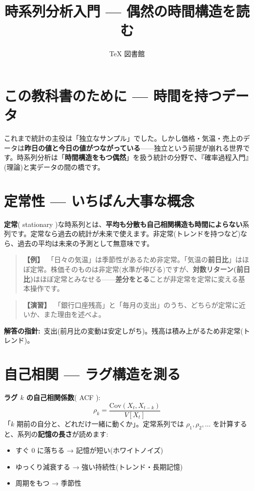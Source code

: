 \documentclass{article}
\title{時系列分析入門 — 偶然の時間構造を読む}
\author{TeX 図書館}
\begin{document}
\section{この教科書のために — 時間を持つデータ}

これまで統計の主役は「独立なサンプル」でした。しかし価格・気温・売上のデータは\textbf{昨日の値と今日の値がつながっている}——独立という前提が崩れる世界です。時系列分析は「\textbf{時間構造をもつ偶然}」を扱う統計の分野で、『確率過程入門』(理論)と実データの間の橋です。

\section{定常性 — いちばん大事な概念}

\textbf{定常}( stationary )な時系列とは、\textbf{平均も分散も自己相関構造も時間によらない}系列です。定常なら過去の統計が未来で使えます。非定常(トレンドを持つなど)なら、過去の平均は未来の予測として無意味です。

\begin{quote}
\textbf{【例】}\ 「日々の気温」は季節性があるため非定常。「気温の\textbf{前日比}」はほぼ定常。株価そのものは非定常(水準が伸びる)ですが、\textbf{対数リターン(前日比)}はほぼ定常とみなせる——\textbf{差分をとる}ことが非定常を定常に変える基本操作です。
\end{quote}

\begin{quote}
\textbf{【演習】}\ 「銀行口座残高」と「毎月の支出」のうち、どちらが定常に近いか、また理由を述べよ。
\end{quote}

\textbf{解答の指針:}\ 支出(前月比の変動は安定しがち)。残高は積み上がるため非定常(トレンド)。

\section{自己相関 — ラグ構造を測る}

\textbf{ラグ \(k\) の自己相関係数}( ACF ):
\[ \rho_k = \frac{\mathrm{Cov}(X_t, X_{t-k})}{V[X_t]} \]
「\(k\) 期前の自分と、どれだけ一緒に動くか」。定常系列では \(\rho_1, \rho_2, \dots\) を計算すると、系列の\textbf{記憶の長さ}が読めます:
\begin{itemize}
\item すぐ 0 に落ちる → 記憶が短い(ホワイトノイズ)
\item ゆっくり減衰する → 強い持続性(トレンド・長期記憶)
\item 周期をもつ → 季節性
\end{itemize}
\end{document}
